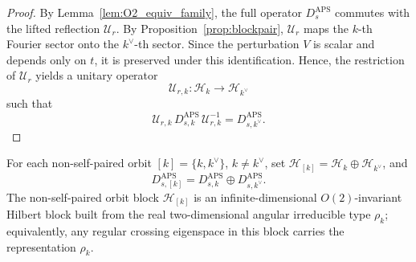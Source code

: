 \documentclass[11pt]{article}
\theoremstyle{definition}
\DeclareMathOperator{\APS}{APS}
\numberwithin{equation}{section}
\begin{document}
\begin{proof}
By Lemma~\ref{lem:O2_equiv_family}, the full operator \(D_s^{\APS}\) commutes with the
lifted reflection \(\mathcal U_r\). By Proposition~\ref{prop:blockpair},
\(\mathcal U_r\) maps the \(k\)-th Fourier sector onto the \(k^\vee\)-th sector. Since the
perturbation \(V\) is scalar and depends only on \(t\), it is preserved under this
identification. Hence, the restriction of \(\mathcal U_r\) yields a unitary operator
\begin{equation}\label{eq:modewise_unitary_section6}
\mathcal U_{r,k}:\mathcal H_k\longrightarrow \mathcal H_{k^\vee}
\end{equation}
such that
\begin{equation}\label{eq:modewise_intertwining_section6}
\mathcal U_{r,k}\,D_{s,k}^{\APS}\,\mathcal U_{r,k}^{-1}
=
D_{s,k^\vee}^{\APS}.
\end{equation}
\end{proof}



For each non-self-paired orbit \([k]=\{k,k^\vee\}\), \(k\neq k^\vee\), set \(\mathcal H_{[k]}=\mathcal H_k\oplus \mathcal H_{k^\vee}\),
and
\begin{equation}\label{eq:orbit_block_operator_section6}
D^{\text{APS}}_{s,[k]}=D^{\text{APS}}_{s,k}\oplus D^{\text{APS}}_{s,k^\vee}.
\end{equation}
The non-self-paired orbit block $\mathcal H_{[k]}$ is an infinite-dimensional
$O(2)$-invariant Hilbert block built from the real two-dimensional angular
irreducible type $\rho_k$; equivalently, any regular crossing eigenspace in
this block carries the representation $\rho_k$.
\end{document}
